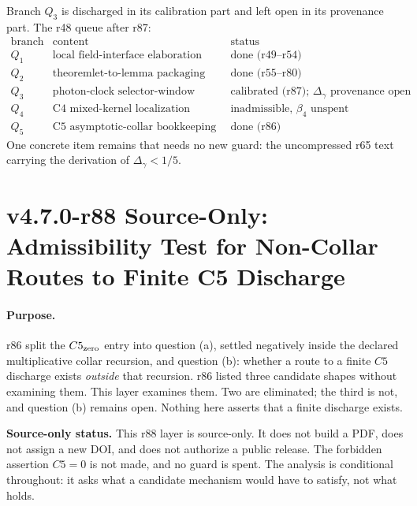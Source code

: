 Branch \(Q_3\) is discharged in its calibration part and left open in its provenance part.
The r48 queue after r87:
\[
\begin{array}{c|l|l}
\text{branch} & \text{content} & \text{status}\\
\hline
Q_1 & \text{local field-interface elaboration} & \text{done (r49--r54)}\\
Q_2 & \text{theoremlet-to-lemma packaging} & \text{done (r55--r80)}\\
Q_3 & \text{photon-clock selector-window calibration} &
\text{calibrated (r87); }\Delta_\gamma\text{ provenance open}\\
Q_4 & \text{C4 mixed-kernel localization} & \text{inadmissible, }\beta_4\text{ unspent}\\
Q_5 & \text{C5 asymptotic-collar bookkeeping} & \text{done (r86)}
\end{array}
\]
One concrete item remains that needs no new guard: the uncompressed r65 text carrying the
derivation of \(\Delta_\gamma<1/5\).


\clearpage
\section*{v4.7.0-r88 Source-Only: Admissibility Test for Non-Collar Routes to Finite C5 Discharge}
\label{sec:r88-non-collar-route-admissibility}

\paragraph{Purpose.}
r86 split the \(C5_{\rm zero}\) entry into question (a), settled negatively inside the
declared multiplicative collar recursion, and question (b): whether a route to a finite
\(C5\) discharge exists \emph{outside} that recursion.  r86 listed three candidate shapes
without examining them.  This layer examines them.  Two are eliminated; the third is not,
and question (b) remains open.  Nothing here asserts that a finite discharge exists.

\noindent\textbf{Source-only status.}
This r88 layer is source-only.  It does not build a PDF, does not assign a new DOI, and does
not authorize a public release.  The forbidden assertion \(C5=0\) is not made, and no guard
is spent.  The analysis is conditional throughout: it asks what a candidate mechanism would
have to satisfy, not what holds.

